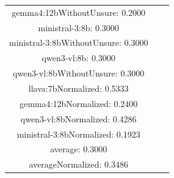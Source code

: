\documentclass[a4paper]{article}
\begin{document}
\begin{tabular}{ccc}
gemma4:12bWithoutUnsure: 0.2000 \\ ministral-3:8b: 0.3000 \\ ministral-3:8bWithoutUnsure: 0.3000 \\ qwen3-vl:8b: 0.3000 \\ qwen3-vl:8bWithoutUnsure: 0.3000 \\ llava:7bNormalized: 0.5333 \\ gemma4:12bNormalized: 0.2400 \\ qwen3-vl:8bNormalized: 0.4286 \\ ministral-3:8bNormalized: 0.1923 \\ average: 0.3000 \\ averageNormalized: 0.3486 \end{minipage}\\
\end{tabular}

\vspace{5mm}
\end{document}
